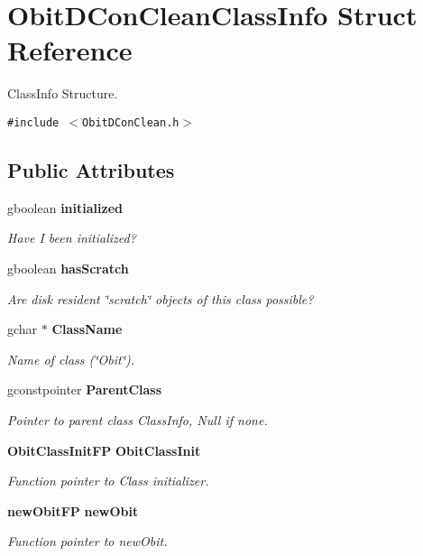 \section{Obit\-DCon\-Clean\-Class\-Info Struct Reference}
\label{structObitDConCleanClassInfo}
Class\-Info Structure.  


{\tt \#include $<$Obit\-DCon\-Clean.h$>$}

\subsection*{Public Attributes}
\begin{CompactItemize}
\item 
gboolean {\bf initialized}
\begin{CompactList}\small\item\em Have I been initialized? \item\end{CompactList}\item 
gboolean {\bf has\-Scratch}
\begin{CompactList}\small\item\em Are disk resident \char`\"{}scratch\char`\"{} objects of this class possible? \item\end{CompactList}\item 
gchar $\ast$ {\bf Class\-Name}
\begin{CompactList}\small\item\em Name of class (\char`\"{}Obit\char`\"{}). \item\end{CompactList}\item 
gconstpointer {\bf Parent\-Class}
\begin{CompactList}\small\item\em Pointer to parent class Class\-Info, Null if none. \item\end{CompactList}\item 
{\bf Obit\-Class\-Init\-FP} {\bf Obit\-Class\-Init}
\begin{CompactList}\small\item\em Function pointer to Class initializer. \item\end{CompactList}\item 
{\bf new\-Obit\-FP} {\bf new\-Obit}
\begin{CompactList}\small\item\em Function pointer to new\-Obit. \item\end{CompactList}\item 

\end{CompactItemize}
